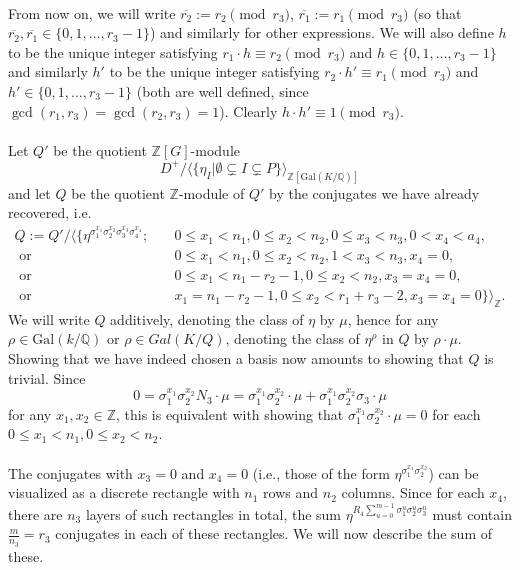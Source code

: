 \documentclass[12pt,a4paper]{article}
\theoremstyle{definition}
\newcommand{\Q}{\mathbb{Q}}
\newcommand{\Z}{\mathbb{Z}}
\newcommand{\Gal}{\mathrm{Gal}}
\newcommand{\uo}{\overline{r_2}}
\newcommand{\vo}{\overline{r_1}}
\begin{document}
\paragraph*{}
From now on, we will write $\uo:=r_2\pmod{r_3}$, $\vo:=r_1\pmod{r_3}$ (so that $\uo,\vo\in\{0,1,\dots,r_3-1\}$) and similarly for other expressions. We will also define $h$ to be the unique integer satisfying $ r_1\cdot h\equiv r_2\pmod{r_3}$ and $h\in\{0,1,\dots,r_3-1\}$ and similarly $h'$ to be the unique integer satisfying $ r_2\cdot h'\equiv r_1\pmod{r_3}$ and $h'\in\{0,1,\dots,r_3-1\}$ (both are well defined, since $\gcd(r_1,r_3)=\gcd(r_2,r_3)=1$). Clearly $h\cdot h'\equiv 1 \pmod{r_3}$.

\paragraph*{}
Let $Q'$ be the quotient $\Z[G]$-module $$D^+/\big\langle \{\eta_I \big\vert \emptyset \subsetneq I \subsetneq P \}\big\rangle_{\Z[\Gal(K/\Q)]}$$
and let $Q$ be the quotient $\Z$-module of $Q'$ by the conjugates we have already recovered, i.e.
\begin{align*}
Q:=Q'/\big\langle \{\eta^{\sigma_1^{x_1}\sigma_2^{x_2}\sigma_3^{x_3}\sigma_4^{x_4}}; \quad & 0\leq x_1< n_1, 0\leq x_2<n_2, 0\leq x_3<n_3,0< x_4<a_4,\\
\text { or }& 0\leq x_1< n_1, 0\leq x_2<n_2, 1< x_3<n_3,x_4=0,\\
\text { or }& 0\leq x_1< n_1-r_2-1, 0\leq x_2<n_2, x_3=x_4=0,\\
\text { or }& x_1= n_1-r_2-1, 0\leq x_2<r_1+r_3-2, x_3=x_4=0 \}\big\rangle_{\Z}.
\end{align*}
We will write $Q$ additively, denoting the class of $\eta$ by $\mu$, hence for any $\rho\in\Gal(k/\Q)$ or $\rho\in Gal(K/Q)$, denoting the class of $\eta^{\rho}$ in $Q$ by $\rho\cdot \mu$.
Showing that we have indeed chosen a basis now amounts to showing that $Q$ is trivial. Since $$0=\sigma_1^{x_1}\sigma_2^{x_2}N_3\cdot \mu=\sigma_1^{x_1}\sigma_2^{x_2}\cdot \mu+\sigma_1^{x_1}\sigma_2^{x_2}\sigma_3\cdot \mu$$
for any $x_1,x_2\in\Z$,
this is equivalent with showing that $\sigma_1^{x_1}\sigma_2^{x_2}\cdot \mu=0$ for each $0\leq x_1<n_1, 0\leq x_2<n_2$.

\paragraph*{}
The conjugates with $x_3=0$ and $x_4=0$ (i.e., those of the form $\eta^{\sigma_1^{x_1}\sigma_2^{x_2}}$) can be visualized as a discrete rectangle with $n_1$ rows and $n_2$ columns. Since for each $x_4$, there are $n_3$ layers of such rectangles in total, the sum $\eta^{R_4\sum_{u=0}^{m-1}\sigma_1^{u}\sigma_2^{u}\sigma_3^{u}}$ must contain $\frac{m}{n_3}=r_3$ conjugates in each of these rectangles. We will now describe the sum of these. 
\end{document}
